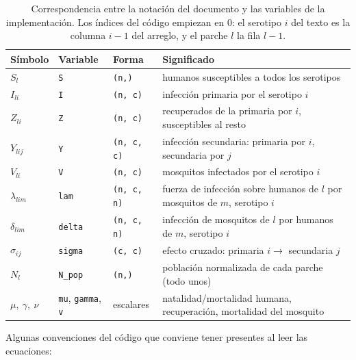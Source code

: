 \documentclass{article}
\numberwithin{equation}{section}
\begin{document}
\begin{table}[h]
\centering
\begin{tabular}{llll}
\hline
Símbolo & Variable & Forma & Significado \\
\hline
$S_l$ & \texttt{S} & \texttt{(n,)} & humanos susceptibles a todos los serotipos \\
$I_{li}$ & \texttt{I} & \texttt{(n, c)} & infección primaria por el serotipo $i$ \\
$Z_{li}$ & \texttt{Z} & \texttt{(n, c)} & recuperados de la primaria por $i$, susceptibles al resto \\
$Y_{lij}$ & \texttt{Y} & \texttt{(n, c, c)} & infección secundaria: primaria por $i$, secundaria por $j$ \\
$V_{li}$ & \texttt{V} & \texttt{(n, c)} & mosquitos infectados por el serotipo $i$ \\
$\lambda_{lim}$ & \texttt{lam} & \texttt{(n, c, n)} & fuerza de infección sobre humanos de $l$ por mosquitos de $m$, serotipo $i$ \\
$\delta_{lim}$ & \texttt{delta} & \texttt{(n, c, n)} & infección de mosquitos de $l$ por humanos de $m$, serotipo $i$ \\
$\sigma_{ij}$ & \texttt{sigma} & \texttt{(c, c)} & efecto cruzado: primaria $i\to$ secundaria $j$ \\
$N_l$ & \texttt{N\_pop} & \texttt{(n,)} & población normalizada de cada parche (todo unos) \\
$\mu,\ \gamma,\ \nu$ & \texttt{mu}, \texttt{gamma}, \texttt{v} & escalares & natalidad/mortalidad humana, recuperación, mortalidad del mosquito \\
\hline
\end{tabular}
\caption{Correspondencia entre la notación del documento y las variables de la implementación. Los índices del código empiezan en $0$: el serotipo $i$ del texto es la columna $i-1$ del arreglo, y el parche $l$ la fila $l-1$.}
\label{tab:correspondencia}
\end{table}

Algunas convenciones del código que conviene tener presentes al leer las ecuaciones:
\end{document}
